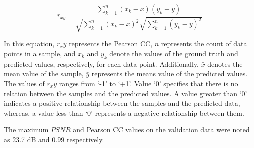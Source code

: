 \begin{equation}
	r_{x 
		y}=\frac{\sum_{k=1}^n\left(x_k-\bar{x}\right)\left(y_k-\bar{y}\right)}{\sqrt{\sum_{k=1}^n\left(x_k-\bar{x}\right)^2}
		\sqrt{\sum_{k=1}^n\left(y_k-\bar{y}\right)^2}}
	\label{eqn:pearsoncc}
\end{equation}

In this equation, $r_xy$ represents the Pearson CC, \(n\) represents the 
count of data points in a sample, and $x_k$ and $y_k$ denote the values 
of the ground truth and predicted values, respectively, for each data point. 
Additionally, $\bar{x}$ denotes the mean value of the sample, $\bar{y}$ 
represents the means value of the predicted values. 
The values of $r_xy$ ranges from ‘-1’ to ‘+1’. 
Value ‘0’ specifies that there is no relation between the samples and the 
predicted values. 
A value greater than ‘0’ indicates a positive relationship between the 
samples 
and the predicted data, whereas, a value less than ‘0’ represents a 
negative relationship between them.

The maximum \(PSNR\) and Pearson CC values on the validation data were noted as 
23.7 dB and \(0.99\) respectively.